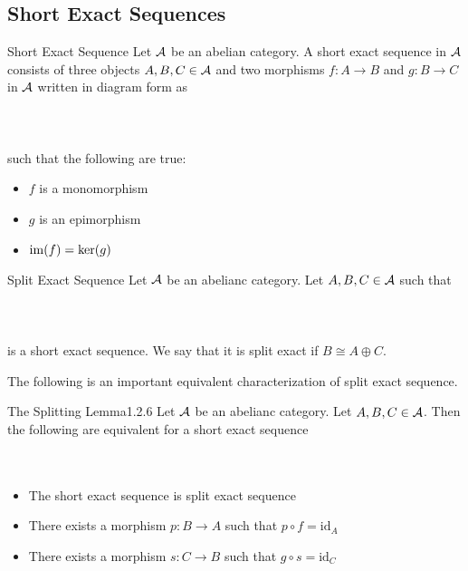 \documentclass[a4paper]{article}
\begin{document}
\subsection{Short Exact Sequences}
\begin{defn}{Short Exact Sequence}{} Let $\mathcal{A}$ be an abelian category. A short exact sequence in $\mathcal{A}$ consists of three objects $A,B,C\in\mathcal{A}$ and two morphisms $f:A\to B$ and $g:B\to C$ in $\mathcal{A}$ written in diagram form as \\~\\
\\~\\
such that the following are true: 
\begin{itemize}
\item $f$ is a monomorphism
\item $g$ is an epimorphism
\item $\operatorname{im}(f)=\ker(g)$
\end{itemize}
\end{defn}

\begin{defn}{Split Exact Sequence}{} Let $\mathcal{A}$ be an abelianc category. Let $A,B,C\in\mathcal{A}$ such that \\~\\
\\~\\
is a short exact sequence. We say that it is split exact if $B\cong A\oplus C$. 
\end{defn}

The following is an important equivalent characterization of split exact sequence. 

\begin{thm}{The Splitting Lemma}{1.2.6} Let $\mathcal{A}$ be an abelianc category. Let $A,B,C\in\mathcal{A}$. Then the following are equivalent for a short exact sequence \\~\\
\\
\begin{itemize}
\item The short exact sequence is split exact sequence
\item There exists a morphism $p:B\to A$ such that $p\circ f=\text{id}_A$
\item There exists a morphism $s:C\to B$ such that $g\circ s=\text{id}_C$
\end{itemize} 
\end{thm}
\end{document}
